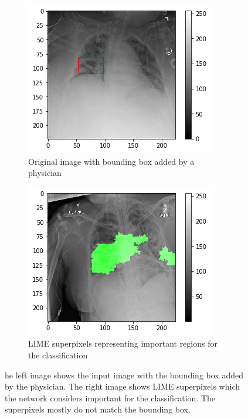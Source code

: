 \begin{figure}[H]
    \centering
    \begin{subfigure}[t]{.45\textwidth}
        \centering
        \includegraphics[width=\linewidth]{chapters/03_classification/images/rise0_bbox}
        \caption{Original image with bounding box added by a physician}
    \end{subfigure}\hspace{1cm}%
    \begin{subfigure}[t]{.45\textwidth}
        \centering
        \includegraphics[width=\linewidth]{chapters/03_classification/images/lime_8.png}
        \caption{LIME superpixels representing important regions for the classification}
    \end{subfigure}
    \caption{he left image shows the input image with the bounding box added by the physician.  The right image  shows  LIME  superpixels  which  the  network considers  important  for  the  classification. The superpixels mostly do not match the bounding box.}
    \label{lime_example_3}
\end{figure}

